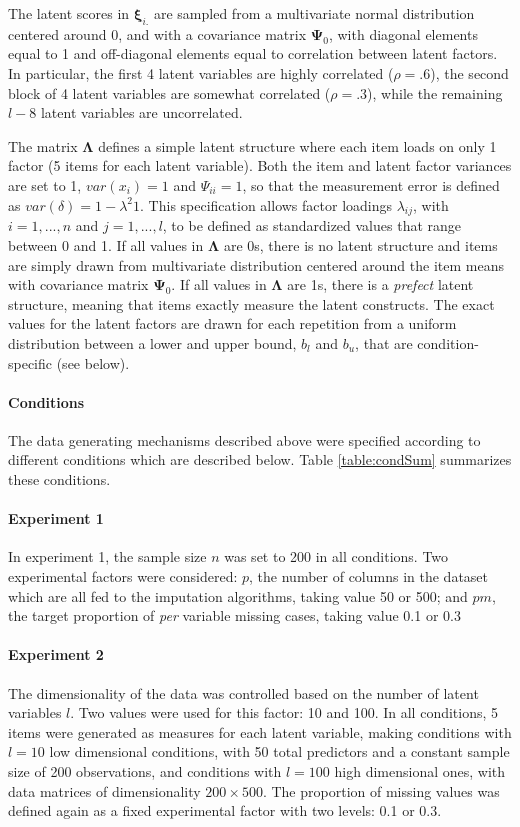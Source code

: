 	The latent scores in $\bm{\xi}_{i.}$ are sampled from a multivariate normal distribution centered around 
	0, and with a covariance matrix $\bm{\Psi}_0$, with diagonal elements equal to 1 and off-diagonal elements 
	equal to correlation between latent factors. 
	In particular, the first 4 latent variables are highly correlated ($\rho = .6$), the second block of 4 
	latent variables are somewhat correlated ($\rho = .3$), while the remaining $l-8$ latent variables are 
	uncorrelated.

	The matrix $\bm{\Lambda}$ defines a simple latent structure where each item loads on only 1 factor (5 items 
	for each latent variable).
	Both the item and latent factor variances are set to 1, $var(x_i) = 1$ and $\Psi_{ii} = 1$, so that 
	the measurement error is defined as $var(\delta) = 1 - \lambda^{2} 1$. 
	This specification allows factor loadings $\lambda_{ij}$, with $i = 1, ..., n$ and $j = 1, ..., l$, to be
	defined as standardized values that range between 0 and 1.
	If all values in $\bm{\Lambda}$ are 0s, there is no latent structure and items are simply drawn from  
	multivariate distribution centered around the item means with covariance matrix $\bm{\Psi}_0$.
	If all values in $\bm{\Lambda}$ are 1s, there is a \emph{prefect} latent structure, meaning that items
	exactly measure the latent constructs.
	The exact values for the latent factors are drawn for each repetition from a uniform distribution between
	a lower and upper bound, $b_l$ and $b_u$, that are condition-specific (see below).

	\paragraph{Conditions}
	
	The data generating mechanisms described above were specified according to different conditions which are
	described below.
	Table \ref{table:condSum} summarizes these conditions.

	\paragraph{Experiment 1}
	In experiment 1, the sample size $n$ was set to 200 in all conditions.
	Two experimental factors were considered: $p$, the number of columns in the dataset which are all fed to the 
	imputation algorithms, taking value 50 or 500; 
	and $pm$, the target proportion of \emph{per} variable missing cases, taking value 0.1 or 0.3

	\paragraph{Experiment 2}
	The dimensionality of the data was controlled based on the number of latent variables $l$.
	Two values were used for this factor: 10 and 100. 
	In all conditions, 5 items were generated as measures for each latent variable, making conditions with $l = 10$ 
	low dimensional conditions, with 50 total predictors and a constant sample size of 200 observations, and 
	conditions with $l = 100$ high dimensional ones, with data matrices of dimensionality $200 \times 500$.
	The proportion of missing values was defined again as a fixed experimental factor with two levels: 0.1 or 0.3.

